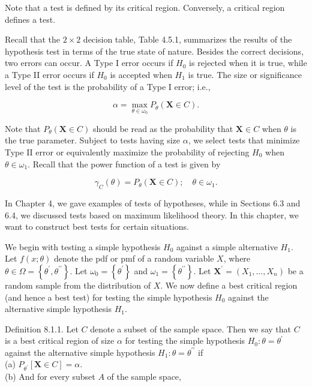 Note that a test is defined by its critical region. Conversely, a critical region defines a test.

Recall that the $2 \times 2$ decision table, Table 4.5.1, summarizes the results of the hypothesis test in terms of the true state of nature. Besides the correct decisions, two errors can occur. A Type I error occurs if $H_{0}$ is rejected when it is true, while a Type II error occurs if $H_{0}$ is accepted when $H_{1}$ is true. The size or significance\\
level of the test is the probability of a Type I error; i.e.,


\begin{equation*}
\alpha=\max _{\theta \in \omega_{0}} P_{\theta}(\mathbf{X} \in C) . \tag{8.1.3}
\end{equation*}


Note that $P_{\theta}(\mathbf{X} \in C)$ should be read as the probability that $\mathbf{X} \in C$ when $\theta$ is the true parameter. Subject to tests having size $\alpha$, we select tests that minimize Type II error or equivalently maximize the probability of rejecting $H_{0}$ when $\theta \in \omega_{1}$. Recall that the power function of a test is given by


\begin{equation*}
\gamma_{C}(\theta)=P_{\theta}(\mathbf{X} \in C) ; \quad \theta \in \omega_{1} . \tag{8.1.4}
\end{equation*}


In Chapter 4, we gave examples of tests of hypotheses, while in Sections 6.3 and 6.4, we discussed tests based on maximum likelihood theory. In this chapter, we want to construct best tests for certain situations.

We begin with testing a simple hypothesis $H_{0}$ against a simple alternative $H_{1}$. Let $f(x ; \theta)$ denote the pdf or pmf of a random variable $X$, where $\theta \in \Omega=\left\{\theta^{\prime}, \theta^{\prime \prime}\right\}$. Let $\omega_{0}=\left\{\theta^{\prime}\right\}$ and $\omega_{1}=\left\{\theta^{\prime \prime}\right\}$. Let $\mathbf{X}^{\prime}=\left(X_{1}, \ldots, X_{n}\right)$ be a random sample from the distribution of $X$. We now define a best critical region (and hence a best test) for testing the simple hypothesis $H_{0}$ against the alternative simple hypothesis $H_{1}$.

Definition 8.1.1. Let $C$ denote a subset of the sample space. Then we say that $C$ is a best critical region of size $\alpha$ for testing the simple hypothesis $H_{0}: \theta=\theta^{\prime}$ against the alternative simple hypothesis $H_{1}: \theta=\theta^{\prime \prime}$ if\\
(a) $P_{\theta^{\prime}}[\mathbf{X} \in C]=\alpha$.\\
(b) And for every subset $A$ of the sample space,

